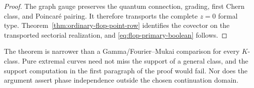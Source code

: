 \begin{proof}
The graph gauge preserves the quantum connection, grading, first Chern class,
and Poincar\'e pairing.  It therefore transports the complete \(z=0\) formal
type.  Theorem~\ref{thm:ordinary-flop-point-row} identifies the covector on
the transported sectorial realization, and
\eqref{eq:flop-primary-boolean} follows.
\end{proof}

The theorem is narrower than a Gamma/Fourier--Mukai comparison for every
\(K\)-class.  Pure extremal curves need not miss the support of a general
class, and the support computation in the first paragraph of the proof would
fail.  Nor does the argument assert phase independence outside the chosen
continuation domain.
